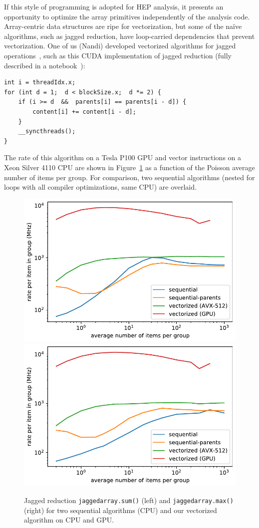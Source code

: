\documentclass{webofc}
\begin{document}
If this style of programming is adopted for HEP analysis, it presents an opportunity to optimize the array primitives independently of the analysis code. Array-centric data structures are ripe for vectorization, but some of the na\"ive algorithms, such as jagged reduction, have loop-carried dependencies that prevent vectorization. One of us (Nandi) developed vectorized algorithms for jagged operations~\cite{jaydeep}, such as this CUDA implementation of jagged reduction (fully described in a notebook~\cite{performance2}):
\begin{center}
\begin{minipage}{0.7\linewidth}
{\small\begin{verbatim}
int i = threadIdx.x;
for (int d = 1;  d < blockSize.x;  d *= 2) {
    if (i >= d  &&  parents[i] == parents[i - d]) {
        content[i] += content[i - d];
    }
    __syncthreads();
}
\end{verbatim}
}
\end{minipage}
\end{center}
\noindent The rate of this algorithm on a Tesla P100 GPU and vector instructions on a Xeon Silver 4110 CPU are shown in Figure~\ref{rates_logy} as a function of the Poisson average number of items per group. For comparison, two sequential algorithms (nested for loops with all compiler optimizations, same CPU) are overlaid.

\begin{figure}[bh]
\includegraphics[width=0.48\linewidth]{sum_rates_logy.pdf}\hfill \includegraphics[width=0.48\linewidth]{max_rates_logy.pdf}

\caption{Jagged reduction \texttt{jaggedarray.sum()} (left) and \texttt{jaggedarray.max()} (right) for two sequential algorithms (CPU) and our vectorized algorithm on CPU and GPU. \label{rates_logy}}
\vspace{-0.5 cm}
\end{figure}
\end{document}
